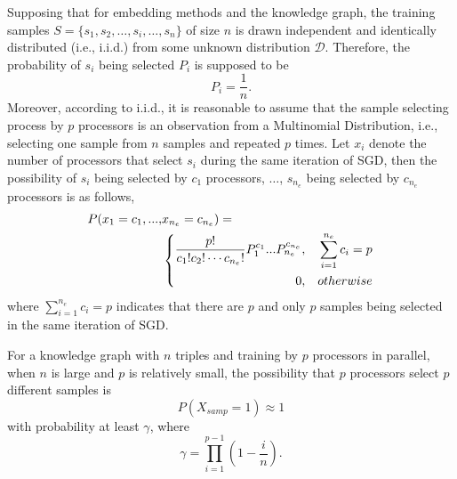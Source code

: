 \documentclass[sigconf]{acmart}
\begin{document}
Supposing that for embedding methods and the knowledge graph, the training samples $ S=\{ s_1, s_2,\ldots, s_i,\ldots, s_{n} \}$
of size $n$ is drawn independent and identically distributed (i.e., i.i.d.) from some unknown distribution $\mathcal{D}$. 
Therefore, the probability of $s_i$ being selected $P_i$ is supposed to be 
\begin{equation}
\label{eqpi}
P_i=\frac{1}{n}.
\end{equation}
Moreover, according to i.i.d., it is reasonable to assume that the sample selecting process by $p$ processors is an observation from a Multinomial Distribution, i.e., selecting one sample from $n$ samples and repeated $p$ times. 
Let $x_i$ denote the number of processors that select $s_i$ during the same iteration of SGD, 
then the possibility of $s_i$ being selected by $c_1$ processors, $\ldots$,  $s_{n_e}$ being selected by $c_{n_e}$ processors is as follows,
\begin{align}
\label{eqmd}
\vspace{-7pt}
 P(x_1=c_1,..., & x_{n_e}=c_{n_e})= \nonumber\\
& \left\{
\begin{aligned}
\frac{p!}{c_1! c_2! \cdots c_{n_e}!}P_1^{c_1}...P_{n_e}^{c_{n_e}} &,  & \sum_{i=1}^{n_e}c_i=p \\
0 &,& otherwise
\end{aligned}
\right.
\vspace{-7pt}
\end{align}
where $\sum_{i=1}^{n_e}c_i=p$ indicates that there are $p$ and only $p$ samples being selected in the same iteration of SGD. 

\begin{theorem}
\label{theosamp}
For a knowledge graph with $n$ triples and training by $p$ processors in parallel, 
when $n$ is large and $p$ is relatively small, the possibility that $p$ processors select $p$ different samples is 
\begin{equation}
P(X_{samp}=1) \approx 1
\end{equation}
with probability at least $\gamma$, where 
\begin{equation}
\gamma=\prod \limits_{i=1}^{p-1}(1- \frac{i}{n}).
\end{equation}
\end{theorem}
\end{document}
